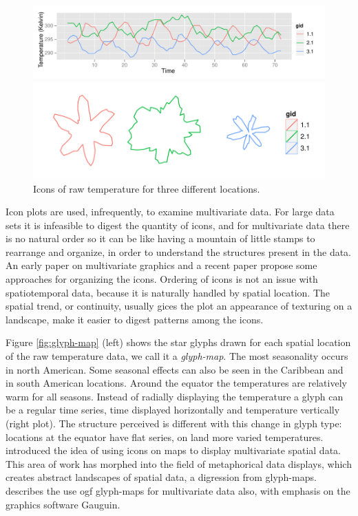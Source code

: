 \documentclass[oneside]{article}
\begin{document}
\begin{figure}[htp]
\centerline{\includegraphics[width=6in]{nasa-glyph-ts.pdf}}
\centerline{\includegraphics[width=6in]{nasa-glyph.pdf}}
\caption{Icons of raw temperature for three different locations.}
\label{fig:glyphs}
\end{figure}

Icon plots are used, infrequently, to examine multivariate data. For large data sets it is infeasible to digest the quantity of icons, and for multivariate data there is no natural order so it can be like having a mountain of little stamps to rearrange and organize, in order to understand the structures present in the data. An early paper on multivariate graphics \citep{kleiner:1981} and a recent paper \citep{hurley:2010} propose some approaches for organizing the icons. Ordering of icons is not an issue with spatiotemporal data, because it is naturally handled by spatial location. The spatial trend, or continuity, usually gices the plot an appearance of texturing on a landscape, make it easier to digest patterns among the icons.

Figure \ref{fig:glyph-map} (left) shows the star glyphs drawn for each spatial location of the raw temperature data, we call it a \emph{glyph-map}. The most seasonality occurs in north American. Some seasonal effects can also be seen in the Caribbean and in south American locations. Around the equator the temperatures are relatively warm for all seasons. Instead of radially displaying the temperature a glyph can be a regular time series, time displayed horizontally and temperature vertically (right plot). The structure perceived is different with this change in glyph type: locations at the equator have flat series, on land more varied temperatures. \citet{pickett:1988} introduced the idea of using icons on maps to display multivariate spatial data. This area of work has morphed into the field of metaphorical data displays, which creates abstract landscapes of spatial data, a digression from glyph-maps. \citet{gribov:2006} describes the use ogf glyph-maps for multivariate data also, with emphasis on the graphics software Gauguin. 
\end{document}

